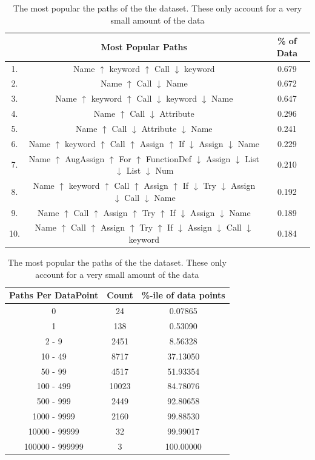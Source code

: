 \begin{table}[p]
    \centering
    \begin{tabular}{c | c | c}       
    
           & Most Popular Paths  &  \% of Data \\  
        \hline
                
        1.  & Name $\uparrow$ keyword $\uparrow$ Call $\downarrow$ keyword &  0.679 \\ 
        2.  & Name $\uparrow$ Call $\downarrow$ Name &  0.672 \\ 
        3.  & Name $\uparrow$ keyword $\uparrow$ Call $\downarrow$ keyword $\downarrow$ Name &  0.647 \\ 
        4.  & Name $\uparrow$ Call $\downarrow$ Attribute &  0.296 \\ 
        5.  & Name $\uparrow$ Call $\downarrow$ Attribute $\downarrow$ Name &  0.241 \\ 
        6.  & Name $\uparrow$ keyword $\uparrow$ Call $\uparrow$ Assign $\uparrow$ If $\downarrow$ Assign $\downarrow$ Name &  0.229 \\ 
        7.  & Name $\uparrow$ AugAssign $\uparrow$ For $\uparrow$ FunctionDef $\downarrow$ Assign $\downarrow$ List $\downarrow$ List $\downarrow$ Num &  0.210 \\ 
        8.  & Name $\uparrow$ keyword $\uparrow$ Call $\uparrow$ Assign $\uparrow$ If $\downarrow$ Try $\downarrow$ Assign $\downarrow$ Call $\downarrow$ Name &  0.192 \\ 
        9.  & Name $\uparrow$ Call $\uparrow$ Assign $\uparrow$ Try $\uparrow$ If $\downarrow$ Assign $\downarrow$ Name &  0.189 \\ 
        10.  & Name $\uparrow$ Call $\uparrow$ Assign $\uparrow$ Try $\uparrow$ If $\downarrow$ Assign $\downarrow$ Call $\downarrow$ keyword &  0.184 \\ 
  
    \end{tabular}
    \caption { The most popular the paths of the the dataset. These only account for a very small amount of the data }
    \label{table:pop_paths} 
    \begin{tabular}{c | c | c  }       
    
        Paths Per DataPoint & Count  &  \%-ile of data points \\  
        \hline
        0 &               24  &     0.07865 \\
        1 &               138  &    0.53090 \\
        2 - 9 &           2451  &   8.56328 \\
        10 - 49 &         8717  &   37.13050 \\
        50 - 99 &         4517  &   51.93354 \\
        100 - 499 &       10023  &  84.78076 \\
        500 - 999 &       2449  &   92.80658 \\
        1000 - 9999 &     2160  &   99.88530 \\
        10000 - 99999 &   32  &     99.99017 \\
        100000 - 999999 & 3  &      100.00000 \\


\end{tabular}
\end{table}
